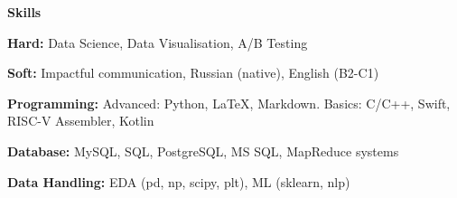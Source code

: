 \begin{center}
    \textbf{Skills}
\end{center}

\textbf{Hard:} Data Science, Data Visualisation, A/B Testing

\textbf{Soft:} Impactful communication, Russian (native), English (B2-C1)

\textbf{Programming:} Advanced: Python, LaTeX, Markdown. Basics: C/C++, Swift, RISC-V Assembler, Kotlin

\textbf{Database:} MySQL, SQL, PostgreSQL, MS SQL, MapReduce systems

\textbf{Data Handling:} EDA (pd, np, scipy, plt), ML (sklearn, nlp)